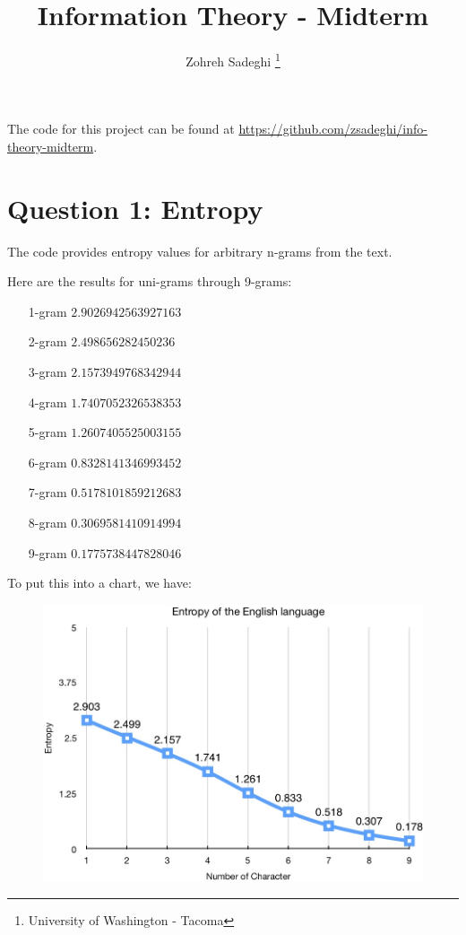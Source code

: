 \documentclass[fleqn]{article}
\title{Information Theory - Midterm}
\author{Zohreh Sadeghi \thanks{University of Washington - Tacoma}}
\begin{document}
\maketitle

\clearpage

\tableofcontents

\clearpage

The code for this project can be found at \url{https://github.com/zsadeghi/info-theory-midterm}.

\section{Question 1: Entropy}

The code provides entropy values for arbitrary n-grams from the text.

Here are the results for uni-grams through 9-grams:

\begin{itemize}
  \item[1-gram] $2.9026942563927163$
  \item[2-gram] $2.498656282450236$
  \item[3-gram] $2.1573949768342944$
  \item[4-gram] $1.7407052326538353$
  \item[5-gram] $1.2607405525003155$
  \item[6-gram] $0.8328141346993452$
  \item[7-gram] $0.5178101859212683$
  \item[8-gram] $0.3069581410914994$
  \item[9-gram] $0.1775738447828046$
\end{itemize}

To put this into a chart, we have:


\begin{figure}[h]
  \includegraphics[width=\textwidth]{images/entropy.jpg}
\end{figure}
\end{document}
